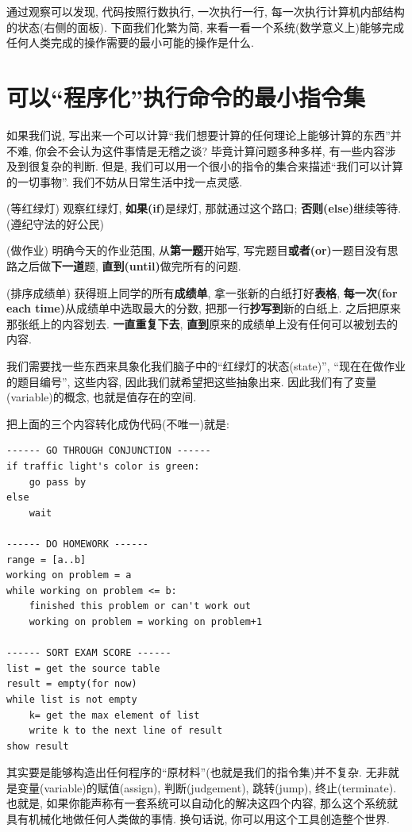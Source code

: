 通过观察可以发现, 代码按照行数执行, 一次执行一行, 每一次执行计算机内部结构的状态(右侧的面板). 下面我们化繁为简, 来看一看一个系统(数学意义上)能够完成任何人类完成的操作需要的最小可能的操作是什么. 

\section{可以``程序化''执行命令的最小指令集}
如果我们说, 写出来一个可以计算``我们想要计算的任何理论上能够计算的东西''并不难, 你会不会认为这件事情是无稽之谈? 毕竟计算问题多种多样, 有一些内容涉及到很复杂的判断.  但是, 我们可以用一个很小的指令的集合来描述``我们可以计算的一切事物''. 我们不妨从日常生活中找一点灵感.
\begin{example}
(等红绿灯) 观察红绿灯, \textbf{如果(if)}是绿灯, 那就通过这个路口; \textbf{否则(else)}继续等待. (遵纪守法的好公民)

(做作业) 明确今天的作业范围, 从\textbf{第一题}开始写, 写完题目\textbf{或者(or)}一题目没有思路之后做\textbf{下一道}题,
\textbf{直到(until)}做完所有的问题.

(排序成绩单) 获得班上同学的所有\textbf{成绩单}, 拿一张新的白纸打好\textbf{表格}, \textbf{每一次(for each time)}从成绩单中选取最大的分数,
把那一行\textbf{抄写到}新的白纸上. 之后把原来那张纸上的内容划去. \textbf{一直重复下去}, \textbf{直到}原来的成绩单上没有任何可以被划去的内容.
\end{example}
我们需要找一些东西来具象化我们脑子中的``红绿灯的状态(state)'', ``现在在做作业的题目编号'', 这些内容, 因此我们就希望把这些抽象出来.
因此我们有了变量(variable)的概念, 也就是值存在的空间. 

把上面的三个内容转化成伪代码(不唯一)就是:
\begin{lstlisting}
------ GO THROUGH CONJUNCTION ------
if traffic light's color is green:
    go pass by
else
    wait

------ DO HOMEWORK ------
range = [a..b]
working on problem = a
while working on problem <= b:
    finished this problem or can't work out
    working on problem = working on problem+1

------ SORT EXAM SCORE ------
list = get the source table
result = empty(for now)
while list is not empty
    k= get the max element of list
    write k to the next line of result
show result
\end{lstlisting}
其实要是能够构造出任何程序的``原材料''(也就是我们的指令集)并不复杂. 无非就是变量(variable)的赋值(assign), 判断(judgement), 跳转(jump), 终止(terminate). 也就是, 如果你能声称有一套系统可以自动化的解决这四个内容,
那么这个系统就具有机械化地做任何人类做的事情. 换句话说, 你可以用这个工具创造整个世界. 

